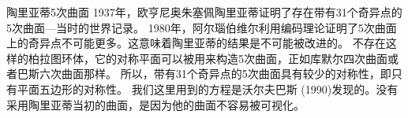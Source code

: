 ﻿\begin{surferPage}{陶里亚蒂5次曲面}
1937年，欧亨尼奥朱塞佩陶里亚蒂证明了存在带有31个奇异点的5次曲面---当时的世界记录。
1980年，阿尔瑙伯维尔利用编码理论证明了5次曲面上的奇异点不可能更多。这意味着陶里亚蒂的结果是不可能被改进的。
不存在这样的柏拉图环体，它的对称平面可以被用来构造5次曲面，正如库默尔四次曲面或者巴斯六次曲面那样。 所以，带有31个奇异点的5次曲面具有较少的对称性，即只有平面五边形的对称性。
我们这里用到的方程是沃尔夫巴斯 (1990)发现的。没有采用陶里亚蒂当初的曲面，是因为他的曲面不容易被可视化。
\end{surferPage}
